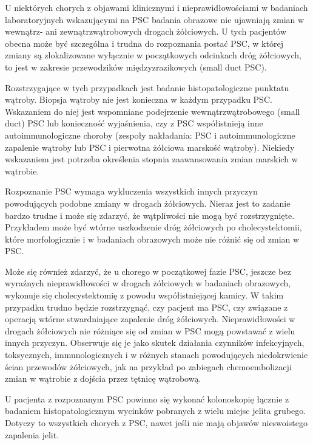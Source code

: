 U  niektórych  chorych  z  objawami  klinicznymi i nieprawidłowościami w badaniach laboratoryjnych  wskazującymi  na  PSC  badania  obrazowe  nie  ujawniają  zmian  w  wewnątrz-  ani zewnątrzwątrobowych  drogach  żółciowych.
U tych pacjentów obecna może być szczególna i  trudna  do  rozpoznania  postać  PSC,  w  której zmiany są zlokalizowane wyłącznie w początkowych  odcinkach  dróg  żółciowych,  to  jest  w  zakresie przewodzików międzyzrazikowych (small duct  PSC).  

Rozstrzygające  w  tych  przypadkach jest badanie histopatologiczne punktatu wątroby. 
Biopsja wątroby nie jest konieczna w każdym przypadku PSC. 
Wskazaniem do niej jest wspomniane podejrzenie wewnątrzwątrobowego (small duct) PSC lub konieczność wyjaśnienia, czy z PSC współistnieją inne autoimmunologiczne  choroby  (zespoły  nakładania: PSC  i  autoimmunologiczne  zapalenie  wątroby lub PSC i pierwotna żółciowa marskość wątroby). 
Niekiedy wskazaniem jest potrzeba określenia  stopnia  zaawansowania  zmian  marskich w wątrobie.

Rozpoznanie PSC wymaga wykluczenia wszystkich  innych  przyczyn  powodujących podobne zmiany w drogach żółciowych. 
Nieraz jest to zadanie bardzo trudne i może się zdarzyć, że wątpliwości nie mogą być  rozstrzygnięte.  Przykładem  może  być wtórne uszkodzenie dróg żółciowych po cholecystektomii, które morfologicznie i w badaniach  obrazowych  może  nie  różnić  się  od zmian w PSC. 

Może się również zdarzyć, że u chorego w początkowej fazie PSC, jeszcze bez  wyraźnych  nieprawidłowości  w  drogach żółciowych  w  badaniach  obrazowych,  wykonuje  się  cholecystektomię  z  powodu  współistniejącej kamicy. 
W takim przypadku trudno będzie rozstrzygnąć, czy pacjent ma PSC, czy związane z operacją wtórne stwardniające  zapalenie  dróg  żółciowych.  Nieprawidłowości  w  drogach  żółciowych  nie różniące  się od zmian w PSC mogą powstawać z wielu innych przyczyn. 
Obserwuje się je jako skutek działania  czynników  infekcyjnych,  toksycznych, immunologicznych i w różnych stanach powodujących  niedokrwienie  ścian  przewodów żółciowych, jak na przykład po zabiegach chemoembolizacji zmian w wątrobie z dojścia przez tętnicę wątrobową.

U pacjenta z rozpoznanym PSC powinno się wykonać kolonoskopię łącznie z badaniem histopatologicznym  wycinków  pobranych z  wielu  miejsc  jelita  grubego.  
Dotyczy  to wszystkich chorych z PSC, nawet jeśli nie mają objawów nieswoistego zapalenia jelit.

